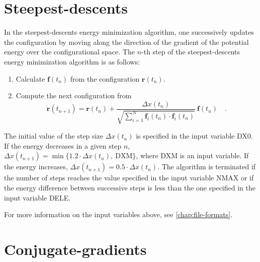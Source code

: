 \documentclass[10pt,a4paper]{report}
\numberwithin{equation}{section}
\newcommand{\fsub}[1]{\mathbf{f}_{#1}}
\begin{document}
\section{Steepest-descents}
\label{sec:steep}

In the steepest-descents energy minimization algorithm, one successively updates the configuration by moving along the direction of the gradient of the potential energy over the configurational space.
The $n$-th step of the steepest-descents energy minimization algorithm is as follows: 
\begin{enumerate}
\item Calculate $\mathbf{f}(t_n)$ from the configuration $\mathbf{r}(t_n)$.
\item Compute the next configuration from
  \begin{equation}
    \label{eq:em-steep}
  \mathbf{r}(t_{n+1}) = \mathbf{r}(t_n) + \frac{\Delta x(t_n)}{\sqrt{\sum_{i=1}^N \fsub{i}(t_n)\cdot\fsub{i}(t_n)}}\ \mathbf{f}(t_n) \quad .
  \end{equation}
\end{enumerate}

The initial value of the step size $\Delta x(t_n)$ is specified in the input variable DX0.
If the energy decreases in a given step $n$, $\Delta x(t_{n+1}) = \min{\{1.2\cdot\Delta x(t_{n}),\ \text{DXM}\}}$, where DXM is an input variable.
If the energy increases, $\Delta x(t_{n+1}) = 0.5\cdot\Delta x(t_{n})$.
The algorithm is terminated if the number of steps reaches the value specified in the input variable NMAX or if the energy difference between successive steps is less than the one specified in the input variable DELE.

For more information on the input variables above, see \autoref{chap:file-formats}.

\section{Conjugate-gradients}
\label{sec:conjugate-gradients}
\end{document}
